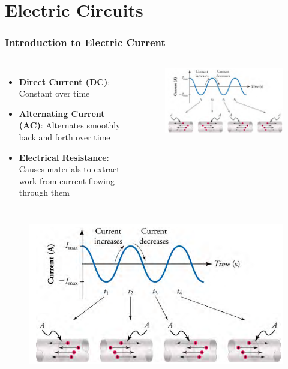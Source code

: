\documentclass{beamer}
\begin{document}
\section{Electric Circuits}

\begin{frame}
    \frametitle{Introduction to Electric Current}
    \begin{columns}
        \begin{itemize}
            \item \textbf{Direct Current (DC)}: Constant over time
            \item \textbf{Alternating Current (AC)}: Alternates smoothly back and forth over time
            \item \textbf{Electrical Resistance}: Causes materials to extract work from current flowing through them
        \end{itemize}
        
        \begin{alertblock}{ }
            \begin{figure}
                \centering
                \includegraphics[width=1\linewidth]{phys11-circuits-ac-dc-current-graph.png}
            \end{figure}
        \end{alertblock}
    \end{columns}
\end{frame}
\begin{frame}{}
\begin{figure}
                \centering
                \includegraphics[width=1\linewidth]{phys11-circuits-ac-dc-current-graph.png}
            \end{figure}    
\end{frame}
\end{document}
